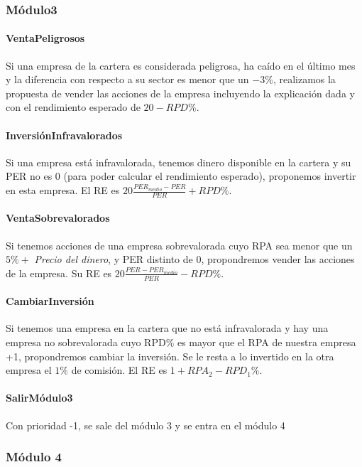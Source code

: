 \documentclass[11pt,leqno]{article}
\theoremstyle{definition_wo_parentheses}
\theoremstyle{plain}
\theoremstyle{remark}
\begin{document}
\subsubsection{Módulo3} 

\paragraph{VentaPeligrosos} Si una empresa de la cartera es considerada peligrosa, ha caído en el último mes y la diferencia con respecto a su sector es menor que un $-3\%$, realizamos la propuesta de vender las acciones de la empresa incluyendo la explicación dada y con el rendimiento esperado de $20 - RPD\%$.

\paragraph{InversiónInfravalorados} Si una empresa está infravalorada, tenemos dinero disponible en la cartera y su PER no es 0 (para poder calcular el rendimiento esperado), proponemos invertir en esta empresa. El RE es $ 20 \frac{PER_{medio} - PER}{PER} + RPD\%$.

\paragraph{VentaSobrevalorados} Si tenemos acciones de una empresa sobrevalorada cuyo RPA sea menor que un $5\% + $ \textit{Precio del dinero}, y PER distinto de 0, propondremos vender las acciones de la empresa. Su RE es  $ 20 \frac{PER - PER_{medio}}{PER} - RPD\%$. 

\paragraph{CambiarInversión} Si tenemos una empresa en la cartera que no está infravalorada y hay una empresa no sobrevalorada cuyo RPD$\%$ es mayor que el RPA de nuestra empresa +1, propondremos cambiar la inversión. Se le resta a lo invertido en la otra empresa el $1\%$ de comisión. El RE es $1+RPA_2-RPD_1\%$.

\paragraph{SalirMódulo3} Con prioridad -1, se sale del módulo 3 y se entra en el módulo 4

\subsubsection{Módulo 4}
\end{document}

